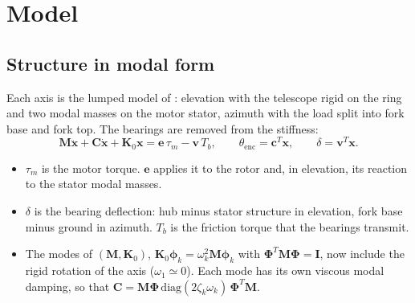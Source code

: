 \section{Model}\label{sec:model}
\subsection{Structure in modal form}
Each axis is the lumped model of : elevation with the telescope rigid on the ring and two modal masses on the motor stator, azimuth with the load split into fork base and fork top. The bearings are removed from the stiffness:
\begin{equation}
\mathbf M\ddot{\mathbf x}+\mathbf C\dot{\mathbf x}+\mathbf K_0\mathbf x=\mathbf e\,\tau_m-\mathbf v\,T_b,\qquad \theta_\mathrm{enc}=\mathbf c^T\mathbf x,\qquad \delta=\mathbf v^T\mathbf x .\label{eq:struct}
\end{equation}
\begin{itemize}
\item $\tau_m$ is the motor torque. $\mathbf e$ applies it to the rotor and, in elevation, its reaction to the stator modal masses.
\item $\delta$ is the bearing deflection: hub minus stator structure in elevation, fork base minus ground in azimuth. $T_b$ is the friction torque that the bearings transmit.
\item The modes of $(\mathbf M,\mathbf K_0)$, $\mathbf K_0\bm\phi_k=\omega_k^2\mathbf M\bm\phi_k$ with $\bm\Phi^T\mathbf M\bm\Phi=\mathbf I$, now include the rigid rotation of the axis ($\omega_1\simeq0$). Each mode has its own viscous modal damping, so that $\mathbf C=\mathbf M\bm\Phi\,\mathrm{diag}(2\zeta_k\omega_k)\,\bm\Phi^T\mathbf M$.
\end{itemize}


